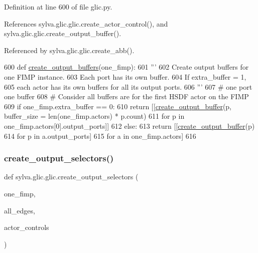 Definition at line 600 of file glic.\+py.



References sylva.\+glic.\+glic.\+create\+\_\+actor\+\_\+control(), and sylva.\+glic.\+glic.\+create\+\_\+output\+\_\+buffer().



Referenced by sylva.\+glic.\+glic.\+create\+\_\+abb().


\begin{DoxyCode}
600   \textcolor{keyword}{def }\hyperlink{namespacesylva_1_1glic_1_1glic_a53c55762a3c7d476be7ee748baeccbeb}{create\_output\_buffers}(one\_fimp):
601     \textcolor{stringliteral}{'''}
602 \textcolor{stringliteral}{      Create output buffers for one FIMP instance.}
603 \textcolor{stringliteral}{      Each port has its own buffer.}
604 \textcolor{stringliteral}{      If extra\_buffer = 1,}
605 \textcolor{stringliteral}{        each actor has its own buffers for all its output ports.}
606 \textcolor{stringliteral}{    '''}
607     \textcolor{comment}{# one port one buffer}
608     \textcolor{comment}{# Consider all buffers are for the first HSDF actor on the FIMP}
609     \textcolor{keywordflow}{if} one\_fimp.extra\_buffer == 0:
610       \textcolor{keywordflow}{return} [[\hyperlink{namespacesylva_1_1glic_1_1glic_a414741c04de0838d506dbeee050368a6}{create\_output\_buffer}(p, buffer\_size = len(one\_fimp.actors) * p.count)
611                \textcolor{keywordflow}{for} p \textcolor{keywordflow}{in} one\_fimp.actors[0].output\_ports]]
612     \textcolor{keywordflow}{else}:
613       \textcolor{keywordflow}{return} [[\hyperlink{namespacesylva_1_1glic_1_1glic_a414741c04de0838d506dbeee050368a6}{create\_output\_buffer}(p)
614                \textcolor{keywordflow}{for} p \textcolor{keywordflow}{in} a.output\_ports]
615               \textcolor{keywordflow}{for} a \textcolor{keywordflow}{in} one\_fimp.actors]
616 
\end{DoxyCode}
\mbox{\label{namespacesylva_1_1glic_1_1glic_a7eb9347832747ffffb52851a1ee2d08f}} 
\subsubsection{\texorpdfstring{create\+\_\+output\+\_\+selectors()}{create\_output\_selectors()}}
{\footnotesize\ttfamily def sylva.\+glic.\+glic.\+create\+\_\+output\+\_\+selectors (\begin{DoxyParamCaption}\item[{}]{one\+\_\+fimp,  }\item[{}]{all\+\_\+edges,  }\item[{}]{actor\+\_\+controls }\end{DoxyParamCaption})}

